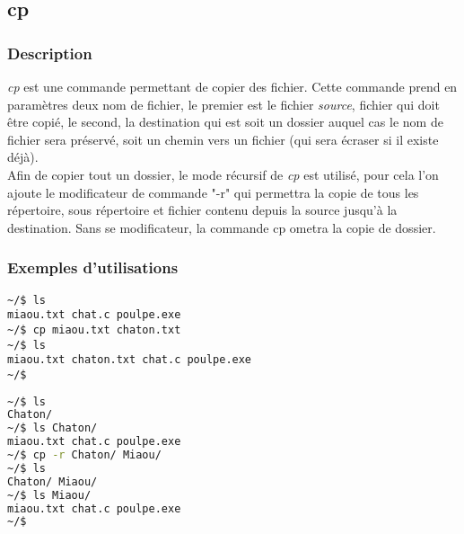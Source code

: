 \subsection{cp}
\subsubsection{Description}
\emph{cp} est une commande permettant de copier des fichier.
Cette commande prend en paramètres deux nom de fichier, le premier est le fichier \emph{source}, fichier qui doit être copié, le second, la destination qui est soit un dossier auquel cas le nom de fichier sera préservé, soit un chemin vers un fichier (qui sera écraser si il existe déjà).\\
Afin de copier tout un dossier, le mode récursif de \emph{cp} est utilisé, pour cela l'on ajoute le modificateur de commande "-r" qui permettra la copie de tous les répertoire, sous répertoire et fichier contenu depuis la source jusqu'à la destination.
Sans se modificateur, la commande cp ometra la copie de dossier.

\subsubsection{Exemples d'utilisations}

\begin{lstlisting}[caption=copie de fichier]
~/$ ls
miaou.txt chat.c poulpe.exe
~/$ cp miaou.txt chaton.txt
~/$ ls
miaou.txt chaton.txt chat.c poulpe.exe
~/$
\end{lstlisting}

\begin{lstlisting}[language=bash,caption=copie de dossier]
~/$ ls
Chaton/
~/$ ls Chaton/
miaou.txt chat.c poulpe.exe
~/$ cp -r Chaton/ Miaou/
~/$ ls
Chaton/ Miaou/
~/$ ls Miaou/
miaou.txt chat.c poulpe.exe
~/$
\end{lstlisting}
